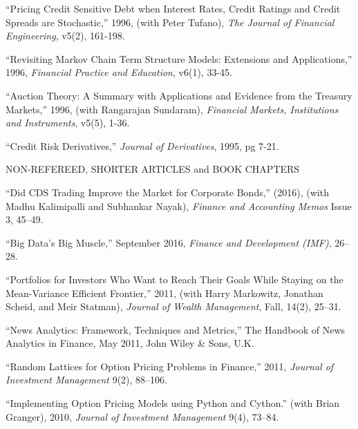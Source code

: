 \documentclass{article}
\begin{document}
\begin{etaremune}
\item
``Pricing Credit Sensitive Debt when Interest Rates, Credit Ratings
and Credit Spreads are Stochastic,'' 1996, 
(with Peter Tufano), {\it The Journal of Financial Engineering},
v5(2), 161-198.

\item
``Revisiting Markov Chain Term Structure Models: Extensions and
Applications,'' 1996, {\it Financial Practice and Education}, v6(1), 33-45.  

\item
``Auction Theory: A Summary with Applications and Evidence
from the Treasury Markets,'' 1996, (with Rangarajan Sundaram),
{\it Financial Markets, Institutions and Instruments}, v5(5), 1-36.

\item
``Credit Risk Derivatives,'' {\it Journal of Derivatives}, 1995, pg 7-21. 



\begin{description}
\item[NON-REFEREED, SHORTER ARTICLES and BOOK CHAPTERS] \mbox{}
\end{description}


\item ``Did CDS Trading Improve the Market for Corporate Bonds,'' (2016), (with Madhu Kalimipalli and Subhankar Nayak), {\it Finance and Accounting Memos} Issue 3, 45--49. 

\item ``Big Data's Big Muscle,'' September 2016, {\it Finance and Development (IMF)}, 26--28. 

\item ``Portfolios for Investors Who Want to Reach Their Goals While Staying on the Mean-Variance Efficient Frontier,'' 2011, (with Harry Markowitz, Jonathan Scheid, and Meir Statman), {\it Journal of Wealth Management}, Fall, 14(2), 25--31.

\item ``News Analytics: Framework, Techniques and Metrics,'' The Handbook of News Analytics in Finance, May 2011, John Wiley \& Sons, U.K. 

\item ``Random Lattices for Option Pricing Problems in Finance,'' 2011, {\it Journal of Investment Management} 9(2), 88--106. 

\item ``Implementing Option Pricing Models using Python and Cython.''
(with Brian Granger), 2010, {\it Journal of Investment Management} 9(4), 73--84. 



\end{etaremune}
\end{document}
